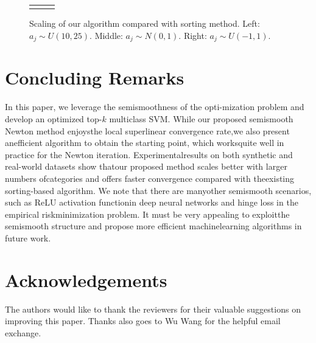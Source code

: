 \documentclass[journal]{IEEEtran}
\begin{document}
\begin{figure}[!htb]
\begin{tabular}{ccc}
\begin{minipage}[t]{0.32\linewidth}
		\end{minipage}
	\end{tabular}
	\caption{Scaling of our algorithm compared with sorting method. Left: $a_j \sim U(10, 25)$. Middle: $a_j \sim N(0, 1)$. Right: $a_j \sim U(-1, 1)$.}     
	\label{fig}  
\end{figure}

\section{Concluding Remarks}
In this paper, we leverage the semismoothness of the opti-mization problem and develop an optimized top-$k$ multiclass SVM. While our proposed semismooth Newton method enjoysthe local superlinear convergence rate,we also present anefficient algorithm to obtain the starting point, which worksquite well in practice for the Newton iteration. Experimentalresults on both synthetic and real-world datasets show thatour proposed method scales better with larger numbers ofcategories and offers faster convergence compared with theexisting sorting-based algorithm. We note that there are manyother semismooth scenarios, such as ReLU activation functionin deep neural networks and hinge loss in the empirical riskminimization problem. It must be very appealing to exploitthe semismooth structure and propose more efficient machinelearning algorithms in future work.

\section*{Acknowledgements}
The authors would like to thank the reviewers for their valuable suggestions on improving this paper. Thanks also goes to Wu Wang for the helpful email exchange.




\end{document}
